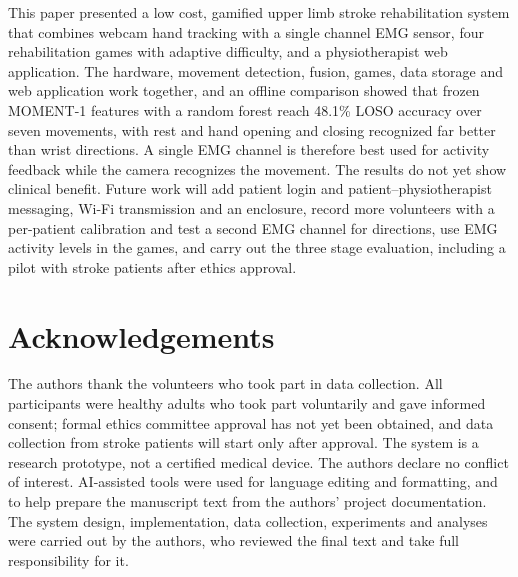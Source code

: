 \documentclass[10pt,a4paper,twocolumn]{article}
\begin{document}
This paper presented a low cost, gamified upper limb stroke rehabilitation system that combines webcam hand tracking with a single channel EMG sensor, four rehabilitation games with adaptive difficulty, and a physiotherapist web application. The hardware, movement detection, fusion, games, data storage and web application work together, and an offline comparison showed that frozen MOMENT-1 features with a random forest reach 48.1\% LOSO accuracy over seven movements, with rest and hand opening and closing recognized far better than wrist directions. A single EMG channel is therefore best used for activity feedback while the camera recognizes the movement. The results do not yet show clinical benefit. Future work will add patient login and patient--physiotherapist messaging, Wi-Fi transmission and an enclosure, record more volunteers with a per-patient calibration and test a second EMG channel for directions, use EMG activity levels in the games, and carry out the three stage evaluation, including a pilot with stroke patients after ethics approval.

\section{Acknowledgements}

The authors thank the volunteers who took part in data collection. All participants were healthy adults who took part voluntarily and gave informed consent; formal ethics committee approval has not yet been obtained, and data collection from stroke patients will start only after approval. The system is a research prototype, not a certified medical device. The authors declare no conflict of interest. AI-assisted tools were used for language editing and formatting, and to help prepare the manuscript text from the authors' project documentation. The system design, implementation, data collection, experiments and analyses were carried out by the authors, who reviewed the final text and take full responsibility for it.
\end{document}
